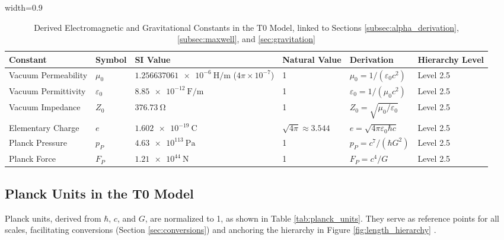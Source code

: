 \documentclass[12pt,a4paper]{article}
\newcommand{\tablescale}{0.9}
\begin{document}
	\begin{table}[htbp]
		\centering
		\begin{adjustbox}{width=\tablescale\textwidth}
			\begin{tabular}{llllll}
				\toprule
				\textbf{Constant} & \textbf{Symbol} & \textbf{SI Value} & \textbf{Natural Value} & \textbf{Derivation} & \textbf{Hierarchy Level} \\
				\midrule
				Vacuum Permeability & \(\mu_0\) & \(\SI{1.256637061e-6}{\henry\per\meter}\) (\(4\pi \times 10^{-7}\)) & 1 & \(\mu_0 = 1/(\varepsilon_0 c^2)\) & Level 2.5 \\
				
				
				Vacuum Permittivity & \(\varepsilon_0\) & \(\SI{8.85e-12}{\farad\per\meter}\) & 1 & \(\varepsilon_0 = 1/(\mu_0 c^2)\) & Level 2.5 \\
				Vacuum Impedance & \(Z_0\) & \(\SI{376.73}{\ohm}\) & 1 & \(Z_0 = \sqrt{\mu_0/\varepsilon_0}\) & Level 2.5 \\
				Elementary Charge & \(e\) & \(\SI{1.602e-19}{\coulomb}\) & \(\sqrt{4\pi} \approx 3.544\) & \(e = \sqrt{4\pi \varepsilon_0 \hbar c}\) & Level 2.5 \\
				Planck Pressure & \(p_P\) & \(\SI{4.63e113}{\pascal}\) & 1 & \(p_P = c^7/(\hbar G^2)\) & Level 2.5 \\
				Planck Force & \(F_P\) & \(\SI{1.21e44}{\newton}\) & 1 & \(F_P = c^4/G\) & Level 2.5 \\
				\bottomrule
			\end{tabular}
		\end{adjustbox}
		\caption{Derived Electromagnetic and Gravitational Constants in the T0 Model, linked to Sections \ref{subsec:alpha_derivation}, \ref{subsec:maxwell}, and \ref{sec:gravitation}}
		\label{tab:em_const}
	\end{table}
	
	\subsection{Planck Units in the T0 Model}
	\label{subsec:planck_units}
	
	Planck units, derived from \(\hbar\), \(c\), and \(G\), are normalized to 1, as shown in Table \ref{tab:planck_units}. They serve as reference points for all scales, facilitating conversions (Section \ref{sec:conversions}) and anchoring the hierarchy in Figure \ref{fig:length_hierarchy} \cite{pascher_planck_2025}.
	
\end{document}
